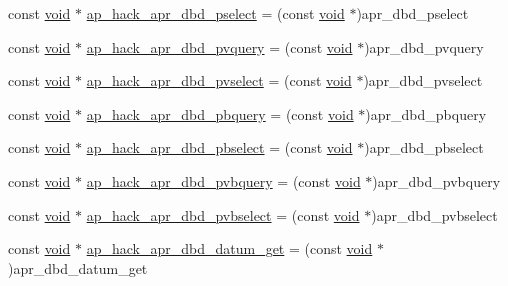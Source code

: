 \begin{DoxyCompactItemize}
const \hyperlink{group__MOD__ISAPI_gacd6cdbf73df3d9eed42fa493d9b621a6}{void} $\ast$ \hyperlink{srclib_2apr-util_2exports_8c_a020b4532a90a308ea938ff32ef0c43a2}{ap\+\_\+hack\+\_\+apr\+\_\+dbd\+\_\+pselect} = (const \hyperlink{group__MOD__ISAPI_gacd6cdbf73df3d9eed42fa493d9b621a6}{void} $\ast$)apr\+\_\+dbd\+\_\+pselect
\item 
const \hyperlink{group__MOD__ISAPI_gacd6cdbf73df3d9eed42fa493d9b621a6}{void} $\ast$ \hyperlink{srclib_2apr-util_2exports_8c_a88f10e140a79bd405af1bd6e905cfd70}{ap\+\_\+hack\+\_\+apr\+\_\+dbd\+\_\+pvquery} = (const \hyperlink{group__MOD__ISAPI_gacd6cdbf73df3d9eed42fa493d9b621a6}{void} $\ast$)apr\+\_\+dbd\+\_\+pvquery
\item 
const \hyperlink{group__MOD__ISAPI_gacd6cdbf73df3d9eed42fa493d9b621a6}{void} $\ast$ \hyperlink{srclib_2apr-util_2exports_8c_a7fddb80978992aef06d3170fe4fb4454}{ap\+\_\+hack\+\_\+apr\+\_\+dbd\+\_\+pvselect} = (const \hyperlink{group__MOD__ISAPI_gacd6cdbf73df3d9eed42fa493d9b621a6}{void} $\ast$)apr\+\_\+dbd\+\_\+pvselect
\item 
const \hyperlink{group__MOD__ISAPI_gacd6cdbf73df3d9eed42fa493d9b621a6}{void} $\ast$ \hyperlink{srclib_2apr-util_2exports_8c_ab24c07b2d2246c4509a7489ac08759e2}{ap\+\_\+hack\+\_\+apr\+\_\+dbd\+\_\+pbquery} = (const \hyperlink{group__MOD__ISAPI_gacd6cdbf73df3d9eed42fa493d9b621a6}{void} $\ast$)apr\+\_\+dbd\+\_\+pbquery
\item 
const \hyperlink{group__MOD__ISAPI_gacd6cdbf73df3d9eed42fa493d9b621a6}{void} $\ast$ \hyperlink{srclib_2apr-util_2exports_8c_a8308c68af279c1014b75be893a20c4ab}{ap\+\_\+hack\+\_\+apr\+\_\+dbd\+\_\+pbselect} = (const \hyperlink{group__MOD__ISAPI_gacd6cdbf73df3d9eed42fa493d9b621a6}{void} $\ast$)apr\+\_\+dbd\+\_\+pbselect
\item 
const \hyperlink{group__MOD__ISAPI_gacd6cdbf73df3d9eed42fa493d9b621a6}{void} $\ast$ \hyperlink{srclib_2apr-util_2exports_8c_ae5ba4e0af947ce85efc17e55d2b85c13}{ap\+\_\+hack\+\_\+apr\+\_\+dbd\+\_\+pvbquery} = (const \hyperlink{group__MOD__ISAPI_gacd6cdbf73df3d9eed42fa493d9b621a6}{void} $\ast$)apr\+\_\+dbd\+\_\+pvbquery
\item 
const \hyperlink{group__MOD__ISAPI_gacd6cdbf73df3d9eed42fa493d9b621a6}{void} $\ast$ \hyperlink{srclib_2apr-util_2exports_8c_a6ecdf1696986ae8285cbc74419b00c81}{ap\+\_\+hack\+\_\+apr\+\_\+dbd\+\_\+pvbselect} = (const \hyperlink{group__MOD__ISAPI_gacd6cdbf73df3d9eed42fa493d9b621a6}{void} $\ast$)apr\+\_\+dbd\+\_\+pvbselect
\item 
const \hyperlink{group__MOD__ISAPI_gacd6cdbf73df3d9eed42fa493d9b621a6}{void} $\ast$ \hyperlink{srclib_2apr-util_2exports_8c_a4c4f0046b1c041f2788b0157245e46a7}{ap\+\_\+hack\+\_\+apr\+\_\+dbd\+\_\+datum\+\_\+get} = (const \hyperlink{group__MOD__ISAPI_gacd6cdbf73df3d9eed42fa493d9b621a6}{void} $\ast$)apr\+\_\+dbd\+\_\+datum\+\_\+get

\end{DoxyCompactItemize}
